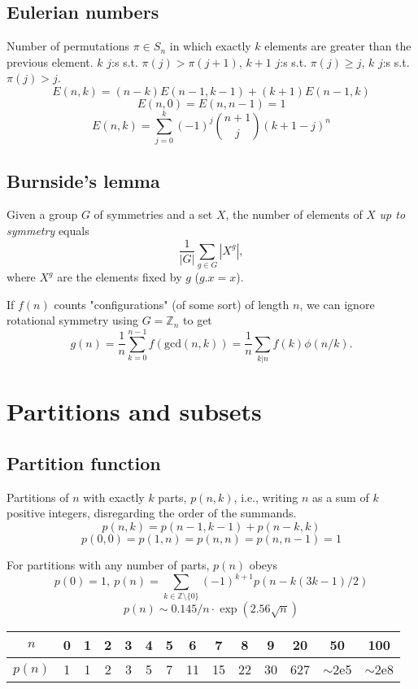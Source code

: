 	\subsection{Eulerian numbers}
		Number of permutations $\pi \in S_n$ in which exactly $k$ elements are greater than the previous element. $k$ $j$:s s.t. $\pi(j)>\pi(j+1)$, $k+1$ $j$:s s.t. $\pi(j)\geq j$, $k$ $j$:s s.t. $\pi(j)>j$.
		$$E(n,k) = (n-k)E(n-1,k-1) + (k+1)E(n-1,k)$$
		$$E(n,0) = E(n,n-1) = 1$$
		$$E(n,k) = \sum_{j=0}^k(-1)^j\binom{n+1}{j}(k+1-j)^n$$

	\subsection{Burnside's lemma}
		Given a group $G$ of symmetries and a set $X$, the number of elements of $X$ \emph{up to symmetry} equals
		 \[ {\frac {1}{|G|}}\sum _{{g\in G}}|X^{g}|, \]
		 where $X^{g}$ are the elements fixed by $g$ ($g.x = x$).

		 If $f(n)$ counts "configurations" (of some sort) of length $n$, we can ignore rotational symmetry using $G = \mathbb Z_n$ to get
		 \[ g(n) = \frac 1 n \sum_{k=0}^{n-1}{f(\text{gcd}(n, k))} = \frac 1 n \sum_{k|n}{f(k)\phi(n/k)}. \]

\section{Partitions and subsets}
	\subsection{Partition function}
		Partitions of $n$ with exactly $k$ parts, $p(n,k)$, i.e., writing $n$ as a sum of $k$ positive integers, disregarding the order of the summands.
		$$p(n,k) = p(n-1,k-1)+p(n-k,k)$$
		$$p(0,0)=p(1,n)=p(n,n)=p(n,n-1)=1$$

		For partitions with any number of parts, $p(n)$ obeys
		\[ p(0) = 1,\ p(n) = \sum_{k \in \mathbb Z \setminus \{0\}}{(-1)^{k+1} p(n - k(3k-1) / 2)} \]
		\[ p(n) \sim 0.145 / n \cdot \exp(2.56 \sqrt{n}) \]

		\begin{center}
		\begin{tabular}{c|c@{\ }c@{\ }c@{\ }c@{\ }c@{\ }c@{\ }c@{\ }c@{\ }c@{\ }c@{\ }c@{\ }c@{\ }c}
			$n$    & 0 & 1 & 2 & 3 & 4 & 5 & 6  & 7  & 8  & 9  & 20  & 50  & 100 \\ \hline
			$p(n)$ & 1 & 1 & 2 & 3 & 5 & 7 & 11 & 15 & 22 & 30 & 627 & $\mathtt{\sim}$2e5 & $\mathtt{\sim}$2e8 \\
		\end{tabular}
		\end{center}
		\newpage

